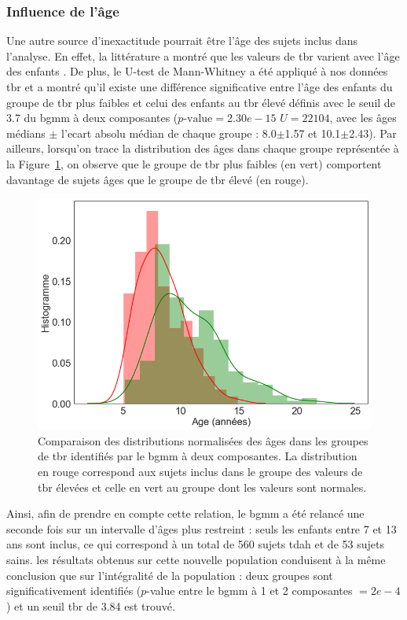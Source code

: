 \subsubsection{Influence de l'âge}

Une autre source d'inexactitude pourrait être l'âge des sujets inclus dans l'analyse. En effet, la littérature a montré que les valeurs de \gls{tbr} varient
avec l'âge des enfants \citep{Liechti2013, Snyder2015, Perone2018}. De plus, le U-test de Mann-Whitney a été appliqué à nos données \gls{tbr} et a montré
qu'il existe une différence significative entre l'âge des enfants du groupe de \gls{tbr} plus faibles et celui des enfants au \gls{tbr} élevé définis avec 
le seuil de 3.7 du \gls{bgmm} à deux composantes
($p\text{-value} = 2.30e-15$\text{,} $U = 22 104$, avec les âges médians $\pm$ l'ecart absolu médian de chaque groupe : 8.0$\pm$1.57 et 10.1$\pm$2.43). Par ailleurs, lorsqu'on trace
la distribution des âges dans chaque groupe représentée à la Figure~\ref{Figure:tbr_age_distribution}, on observe que le groupe de \gls{tbr} plus faibles (en vert) comportent 
davantage de sujets âges que le groupe de \gls{tbr} élevé (en rouge). 

\begin{figure}[h!]
  \centering
	\includegraphics[width=0.7\linewidth]{figures/chapter-4/tbr-age-distribution} 
  \caption{Comparaison des distributions normalisées des âges dans les groupes de \gls{tbr} identifiés par le \gls{bgmm} à deux composantes. La distribution
	en rouge correspond aux sujets inclus dans le groupe des valeurs de \gls{tbr} élevées et celle en vert au groupe dont les valeurs sont normales.}
  \label{Figure:tbr_age_distribution}
\end{figure}

Ainsi, afin de prendre en compte cette relation, le \gls{bgmm} a été relancé une seconde fois sur un intervalle d'âges plus restreint : seuls les enfants
entre 7 et 13 ans sont inclus, ce qui correspond à un total de 560 sujets \gls{tdah} et de 53 sujets sains. les résultats obtenus sur cette nouvelle population 
conduisent à la même conclusion que sur l'intégralité de la population : deux groupes sont significativement identifiés ($p$-value entre le \gls{bgmm} à 1 et 2 
composantes $= 2e-4$) et un seuil \gls{tbr} de 3.84 est trouvé. 

